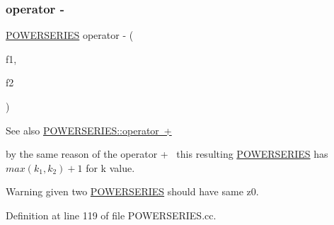 \subsubsection{\texorpdfstring{operator -\/}{operator -}}
{\footnotesize\ttfamily \mbox{\hyperlink{classi_r_r_a_m_1_1_p_o_w_e_r_s_e_r_i_e_s}{P\+O\+W\+E\+R\+S\+E\+R\+I\+ES}} operator -\/ (\begin{DoxyParamCaption}\item[{const \mbox{\hyperlink{classi_r_r_a_m_1_1_p_o_w_e_r_s_e_r_i_e_s}{P\+O\+W\+E\+R\+S\+E\+R\+I\+ES}} \&}]{f1,  }\item[{const \mbox{\hyperlink{classi_r_r_a_m_1_1_p_o_w_e_r_s_e_r_i_e_s}{P\+O\+W\+E\+R\+S\+E\+R\+I\+ES}} \&}]{f2 }\end{DoxyParamCaption})\hspace{0.3cm}{\ttfamily [friend]}}

\begin{DoxySeeAlso}{See also}
\mbox{\hyperlink{classi_r_r_a_m_1_1_p_o_w_e_r_s_e_r_i_e_s_a3b6840781be086f4d790bc7fb56d15cd}{P\+O\+W\+E\+R\+S\+E\+R\+I\+E\+S\+::operator +}}
\end{DoxySeeAlso}
by the same reason of the operator +~\newline
this resulting \mbox{\hyperlink{classi_r_r_a_m_1_1_p_o_w_e_r_s_e_r_i_e_s}{P\+O\+W\+E\+R\+S\+E\+R\+I\+ES}} has $ max(k_1, k_2)+1 $ for k value.~\newline
\begin{DoxyWarning}{Warning}
given two \mbox{\hyperlink{classi_r_r_a_m_1_1_p_o_w_e_r_s_e_r_i_e_s}{P\+O\+W\+E\+R\+S\+E\+R\+I\+ES}} should have same z0. 
\end{DoxyWarning}


Definition at line 119 of file P\+O\+W\+E\+R\+S\+E\+R\+I\+E\+S.\+cc.


\begin{DoxyCode}{0}

\end{DoxyCode}
\mbox{\label{classi_r_r_a_m_1_1_p_o_w_e_r_s_e_r_i_e_s_a3b6840781be086f4d790bc7fb56d15cd}} 

